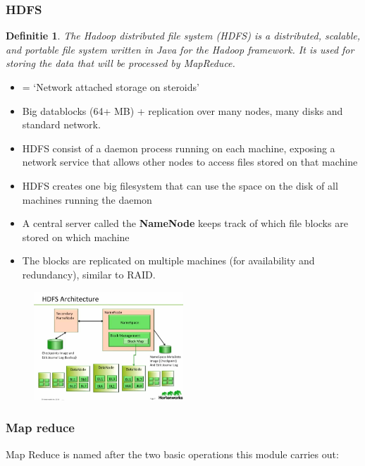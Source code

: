 \documentclass{article}
\newtheorem{theorem}{Definitie}[section]
\begin{document}
\subsubsection{HDFS}

\begin{theorem}
    The Hadoop distributed file system (HDFS) is a distributed, scalable, and portable 
    file system written in Java for the Hadoop framework. It is used for storing the 
    data that will be processed by MapReduce.
\end{theorem}


\begin{itemize}
    \item = `Network attached storage on steroids'
    \item Big datablocks (64+ MB) + replication over many nodes, many disks and standard network.
    \item HDFS consist of a daemon process running on each machine, exposing a network service that allows other nodes to access files stored on that machine
    \item HDFS creates one big filesystem that can use the space on the disk of all machines running the daemon
    \item A central server called the \textbf{NameNode} keeps track of which file blocks are stored on which machine
    \item The blocks are replicated on multiple machines (for availability and redundancy), similar to RAID.
\end{itemize}

\begin{figure}[H]
    \centering
    \includegraphics[width=0.5\textwidth]{hdfs.png}
\end{figure}

\subsubsection{Map reduce}

Map Reduce is named after the two basic operations this module carries out:
\end{document}
